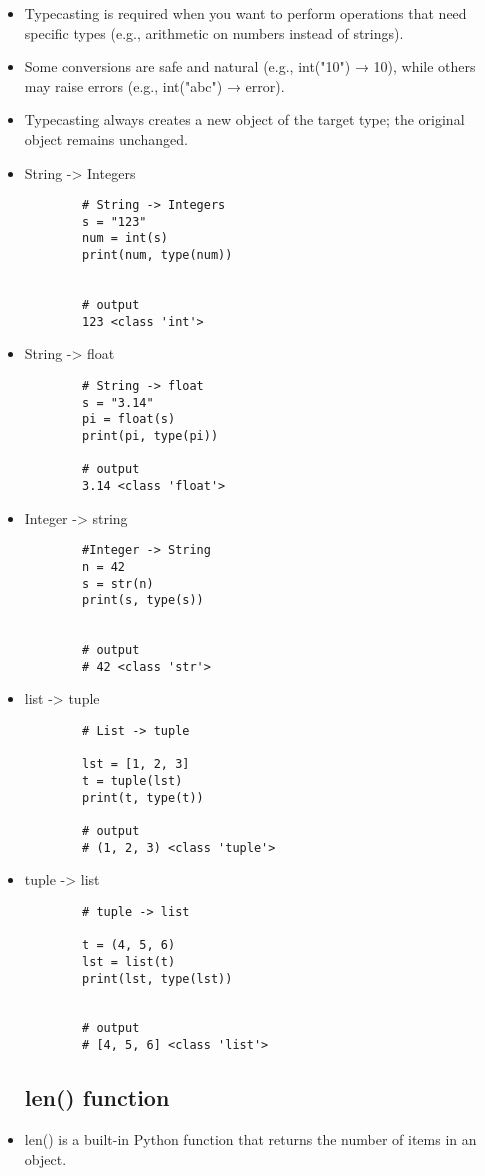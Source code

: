 \documentclass[a4paper,11pt]{article}
\theoremstyle{mytheor}
\begin{document}
\begin{itemize}
	\item Typecasting is required when you want to perform operations that need specific types (e.g., arithmetic on numbers instead of strings).
	
	\item Some conversions are safe and natural (e.g., int("10") → 10), while others may raise errors (e.g., int("abc") → error).
	
	\item Typecasting always creates a new object of the target type; the original object remains unchanged.
	
	\item String -> Integers
	\begin{lstlisting}
		# String -> Integers
		s = "123"
		num = int(s)
		print(num, type(num))
		
		
		# output
		123 <class 'int'>
	\end{lstlisting}
	
	\item String -> float
	\begin{lstlisting}
		# String -> float
		s = "3.14"
		pi = float(s)
		print(pi, type(pi))
		
		# output
		3.14 <class 'float'>
	\end{lstlisting}
	
	\item Integer -> string
	\begin{lstlisting}
		#Integer -> String
		n = 42
		s = str(n)
		print(s, type(s))
		
		
		# output
		# 42 <class 'str'>
	\end{lstlisting}
	
	\item list -> tuple
	\begin{lstlisting}
		# List -> tuple
		
		lst = [1, 2, 3]
		t = tuple(lst)
		print(t, type(t))
		
		# output
		# (1, 2, 3) <class 'tuple'>
	\end{lstlisting}
	
	\item tuple -> list
	\begin{lstlisting}
		# tuple -> list
		
		t = (4, 5, 6)
		lst = list(t)
		print(lst, type(lst))
		
		
		# output
		# [4, 5, 6] <class 'list'>
	\end{lstlisting}
	
	\subsection{len() function}
	\item len() is a built-in Python function that returns the number of items in an object.
	

\end{itemize}
\end{document}
